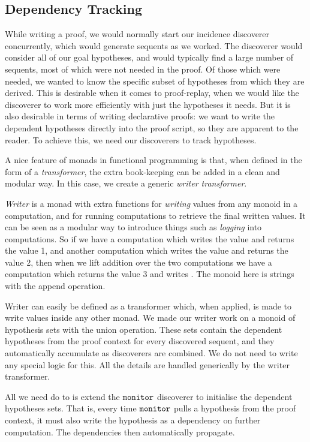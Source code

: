 \subsection{Dependency Tracking}\label{sec:WriterMonad}
While writing a proof, we would normally start our incidence discoverer concurrently, which would generate sequents as we worked. The discoverer would consider all of our goal hypotheses, and would typically find a large number of sequents, most of which were not needed in the proof. Of those which were needed, we wanted to know the specific subset of hypotheses from which they are derived. This is desirable when it comes to proof-replay, when we would like the discoverer to work more efficiently with just the hypotheses it needs. But it is also desirable in terms of writing declarative proofs: we want to write the dependent hypotheses directly into the proof script, so they are apparent to the reader. To achieve this, we need our discoverers to track hypotheses.

A nice feature of monads in functional programming is that, when defined in the form of a \emph{transformer}, the extra book-keeping can be added in a clean and modular way. In this case, we create a generic \emph{writer transformer}.

\emph{Writer} is a monad with extra functions for \emph{writing} values from any monoid in a computation, and for running computations to retrieve the final written values. It can be seen as a modular way to introduce things such as \emph{logging} into computations. So if we have a computation which writes the value  and returns the value 1, and another computation which writes the value  and returns the value 2, then when we lift addition over the two computations we have a computation which returns the value 3 and writes . The monoid here is strings with the append operation.

Writer can easily be defined as a transformer which, when applied, is made to write values inside any other monad. We made our writer work on a monoid of hypothesis sets with the union operation. These sets contain the dependent hypotheses from the proof context for every discovered sequent, and they automatically accumulate as discoverers are combined. We do not need to write any special logic for this. All the details are handled generically by the writer transformer.

All we need do to is extend the $\texttt{monitor}$ discoverer to initialise the dependent hypotheses sets. That is, every time $\texttt{monitor}$ pulls a hypothesis from the proof context, it must also write the hypothesis as a dependency on further computation. The dependencies then automatically propagate.


